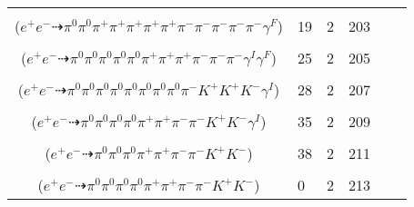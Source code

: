 \documentclass[landscape]{article}
\newcounter{rownumbers}
\newcommand\rn{\stepcounter{rownumbers}\arabic{rownumbers}}
\newcommand{\EOL}{\\} %
\newcommand{\topoTags}[1]{#1} %
\begin{document}
\begin{longtable}{clcccc}
\rn & \makecell[l]{ $ 
e^{+} e^{-} \rightarrow \pi^{0} \pi^{0} \rho^{0} \rho^{0} \rho^{0} \pi^{+} \pi^{+} \pi^{-} \pi^{-} ,
\rho^{0} \rightarrow \pi^{+} \pi^{-} ,
\rho^{0} \rightarrow \pi^{+} \pi^{-} ,
\rho^{0} \rightarrow \pi^{+} \pi^{-} \gamma^{F} 
$ \\ ($
e^{+} e^{-} \dashrightarrow \pi^{0} \pi^{0} \pi^{+} \pi^{+} \pi^{+} \pi^{+} \pi^{+} \pi^{-} \pi^{-} \pi^{-} \pi^{-} \pi^{-} \gamma^{F} 
$) } & \topoTags{19 & }2 & 203 \EOL

\rn & \makecell[l]{ $ 
e^{+} e^{-} \rightarrow \pi^{0} \pi^{0} \pi^{0} \rho^{0} \pi^{+} \rho^{-} \omega \gamma^{I} ,
\rho^{0} \rightarrow \pi^{+} \pi^{-} \gamma^{F} ,
\rho^{-} \rightarrow \pi^{0} \pi^{-} ,
\omega \rightarrow \pi^{0} \pi^{+} \pi^{-} 
$ \\ ($
e^{+} e^{-} \dashrightarrow \pi^{0} \pi^{0} \pi^{0} \pi^{0} \pi^{0} \pi^{+} \pi^{+} \pi^{+} \pi^{-} \pi^{-} \pi^{-} \gamma^{I} \gamma^{F} 
$) } & \topoTags{25 & }2 & 205 \EOL

\rn & \makecell[l]{ $ 
e^{+} e^{-} \rightarrow \pi^{0} \pi^{0} \pi^{0} \rho^{-} \bar{K}^{*} K^{+} K^{+} K^{-} \gamma^{I} ,
\rho^{-} \rightarrow \pi^{0} \pi^{-} ,
\bar{K}^{*} \rightarrow \pi^{0} \bar{K}^{0} ,
\bar{K}^{0} \rightarrow K_{L}^{0} ,
K_{L}^{0} \rightarrow \pi^{0} \pi^{0} \pi^{0} 
$ \\ ($
e^{+} e^{-} \dashrightarrow \pi^{0} \pi^{0} \pi^{0} \pi^{0} \pi^{0} \pi^{0} \pi^{0} \pi^{0} \pi^{-} K^{+} K^{+} K^{-} \gamma^{I} 
$) } & \topoTags{28 & }2 & 207 \EOL

\rn & \makecell[l]{ $ 
e^{+} e^{-} \rightarrow \pi^{0} \pi^{0} \pi^{-} \rho^{+} \rho^{+} K^{*} K^{-} \gamma^{I} ,
\rho^{+} \rightarrow \pi^{0} \pi^{+} ,
\rho^{+} \rightarrow \pi^{0} \pi^{+} ,
K^{*} \rightarrow \pi^{-} K^{+} 
$ \\ ($
e^{+} e^{-} \dashrightarrow \pi^{0} \pi^{0} \pi^{0} \pi^{0} \pi^{+} \pi^{+} \pi^{-} \pi^{-} K^{+} K^{-} \gamma^{I} 
$) } & \topoTags{35 & }2 & 209 \EOL

\rn & \makecell[l]{ $ 
e^{+} e^{-} \rightarrow \pi^{0} \rho^{0} \pi^{-} \rho^{+} K^{-} K^{*+} ,
\rho^{0} \rightarrow \pi^{+} \pi^{-} ,
\rho^{+} \rightarrow \pi^{0} \pi^{+} ,
K^{*+} \rightarrow \pi^{0} K^{+} 
$ \\ ($
e^{+} e^{-} \dashrightarrow \pi^{0} \pi^{0} \pi^{0} \pi^{+} \pi^{+} \pi^{-} \pi^{-} K^{+} K^{-} 
$) } & \topoTags{38 & }2 & 211 \EOL

\rn & \makecell[l]{ $ 
e^{+} e^{-} \rightarrow \pi^{0} \pi^{0} \pi^{-} \rho^{+} \omega K^{+} K^{-} ,
\rho^{+} \rightarrow \pi^{0} \pi^{+} ,
\omega \rightarrow \pi^{0} \pi^{+} \pi^{-} 
$ \\ ($
e^{+} e^{-} \dashrightarrow \pi^{0} \pi^{0} \pi^{0} \pi^{0} \pi^{+} \pi^{+} \pi^{-} \pi^{-} K^{+} K^{-} 
$) } & \topoTags{0 & }2 & 213 \EOL


\end{longtable}
\end{document}
